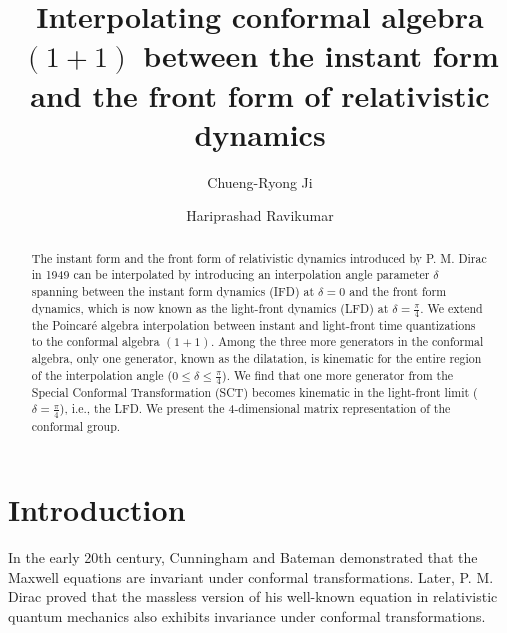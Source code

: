 \documentclass[%
 reprint,
superscriptaddress,
 amsmath,amssymb,
 aps,
]{revtex4-2}
\begin{document}

\title{Interpolating conformal algebra $(1+1)$ between the instant form
and the front form of relativistic dynamics}

\author{Chueng-Ryong Ji}

\author{Hariprashad Ravikumar}


\begin{abstract}
The instant form and the front form of relativistic dynamics introduced by P. M. Dirac in 1949 can be interpolated by introducing an interpolation angle parameter $\delta$ spanning between the instant form dynamics (IFD) at $\delta=0$ and the front form dynamics, which is now known as the light-front dynamics (LFD) at $\delta=\frac{\pi}{4}$. We extend the Poincar\'e algebra interpolation between instant and light-front time quantizations to the conformal algebra $(1+1)$. Among the three more generators in the conformal algebra, only one generator, known as the dilatation, is kinematic for the entire region of the interpolation angle ($0\leq\delta\leq\frac{\pi}{4}$). We find that one more generator from the Special Conformal Transformation (SCT) becomes kinematic in the light-front limit ($\delta=\frac{\pi}{4}$), i.e., the LFD. We present the 4-dimensional matrix representation of the conformal group. %
\end{abstract}
\maketitle


\section{Introduction}
\label{sec:introduction}

In the early 20th century, Cunningham \cite{Cunningham1910} and Bateman \cite{Bateman1910} demonstrated that the Maxwell equations are invariant under conformal transformations. Later, P. M. Dirac \cite{Dirac1936} proved that the massless version of his well-known equation in relativistic quantum mechanics also exhibits invariance under conformal transformations. 
\end{document}
